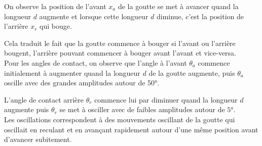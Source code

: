 On observe la position de l'avant $x_{a}$ de la goutte se met à avancer quand la longueur $d$ augmente et lorsque cette longueur $d$ diminue, c'est la position de l'arrière $x_{r}$ qui bouge.

Cela traduit le fait que la goutte commence à bouger si l'avant ou l'arrière bougent, l'arrière pouvant commencer à bouger avant l'avant et vice-versa.\\

Pour les angles de contact, on observe que l'angle à l'avant $\theta_{a}$ commence initialement à augmenter quand la longueur $d$ de la goutte augmente, puis $\theta_{a}$ oscille avec des grandes amplitudes autour de \ang{50}.

L'angle de contact arrière $\theta_{r}$ commence lui par diminuer quand la longueur $d$ augmente puis $\theta_{r}$ se met à osciller avec de faibles amplitudes autour de $\ang{5}$.\\

Les oscillations correspondent à des mouvements oscillant de la goutte qui oscillait en reculant et en avançant rapidement autour d'une même position avant d'avancer subitement.

